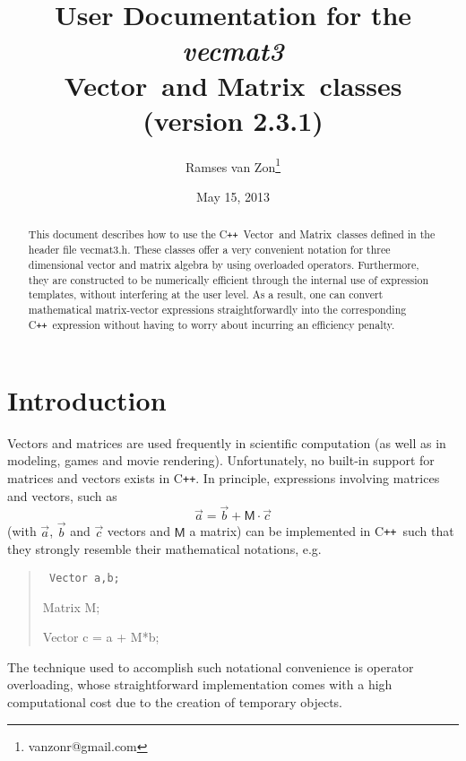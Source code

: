 \documentclass[12pt,twoside]{article}
\newcommand{\Vector}{{Vector}}
\newcommand{\Matrix}{{Matrix}}
\newcommand{\cxx}{C\texttt{++}}
\begin{document}
\setlength{\parskip}{1mm}

\title{User Documentation for the  \emph{vecmat3}\\\Vector\ and
  \Matrix\ classes\\(version 2.3.1)}

\author{Ramses van Zon\footnote{vanzonr@gmail.com}}

\date{May 15, 2013}

\maketitle
\begin{abstract}
This document describes how to use the \cxx\ \Vector\ and
\Matrix\ classes defined in the header file vecmat3.h. These classes
offer a very convenient notation for three dimensional vector and
matrix algebra by using overloaded operators.  Furthermore, they are
constructed to be numerically efficient through the internal use of
expression templates, without interfering at the user level.  As a
result, one can convert mathematical matrix-vector expressions
straightforwardly into the corresponding \cxx\ expression without
having to worry about incurring an efficiency penalty.
\end{abstract}

\newpage

\renewcommand{\contentsname}{\vspace{-13mm}}
\tableofcontents

\newpage

\section{Introduction}
Vectors and matrices are used frequently in scientific computation (as
well as in modeling, games and movie rendering).  Unfortunately, no
built-in support for matrices and vectors exists in \cxx.  In
principle, expressions involving matrices and vectors, such as
\[
\vec a=\vec b+\mathsf M \cdot \vec c
\]
(with $\vec a$, $\vec b$ and $\vec c$ vectors and $\mathsf M$ a
matrix) can be implemented in \cxx\
such that they strongly resemble their mathematical notations, e.g.
\begin{quote}
\tt
Vector a,b;

Matrix M;

Vector c = a + M*b;
\end{quote}
The technique used to accomplish such notational convenience is
operator overloading, whose straightforward implementation comes with
a high computational cost due to the creation of temporary
objects.
\end{document}
